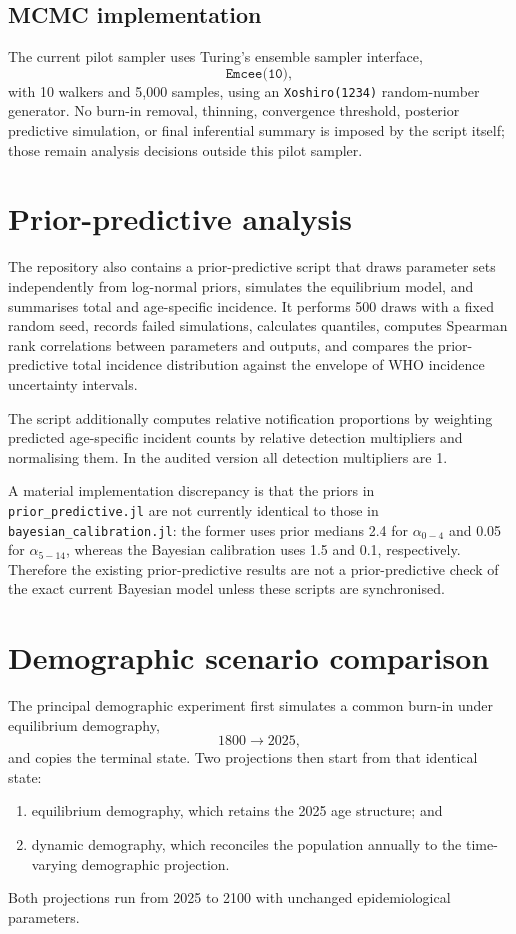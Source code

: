 \documentclass[11pt]{article}
\newcommand{\code}[1]{\texttt{#1}}
\begin{document}
\subsection{MCMC implementation}

The current pilot sampler uses Turing's ensemble sampler interface,
\begin{equation}
\code{Emcee(10)},
\end{equation}
with 10 walkers and 5,000 samples, using an \code{Xoshiro(1234)} random-number generator. No burn-in removal, thinning, convergence threshold, posterior predictive simulation, or final inferential summary is imposed by the script itself; those remain analysis decisions outside this pilot sampler.

\section{Prior-predictive analysis}

The repository also contains a prior-predictive script that draws parameter sets independently from log-normal priors, simulates the equilibrium model, and summarises total and age-specific incidence. It performs 500 draws with a fixed random seed, records failed simulations, calculates quantiles, computes Spearman rank correlations between parameters and outputs, and compares the prior-predictive total incidence distribution against the envelope of WHO incidence uncertainty intervals.

The script additionally computes relative notification proportions by weighting predicted age-specific incident counts by relative detection multipliers and normalising them. In the audited version all detection multipliers are 1.

A material implementation discrepancy is that the priors in \code{prior\_predictive.jl} are not currently identical to those in \code{bayesian\_calibration.jl}: the former uses prior medians 2.4 for $\alpha_{0-4}$ and 0.05 for $\alpha_{5-14}$, whereas the Bayesian calibration uses 1.5 and 0.1, respectively. Therefore the existing prior-predictive results are not a prior-predictive check of the exact current Bayesian model unless these scripts are synchronised.

\section{Demographic scenario comparison}

The principal demographic experiment first simulates a common burn-in under equilibrium demography,
\begin{equation}
1800\longrightarrow 2025,
\end{equation}
and copies the terminal state. Two projections then start from that identical state:
\begin{enumerate}[label=(\alph*)]
\item equilibrium demography, which retains the 2025 age structure; and
\item dynamic demography, which reconciles the population annually to the time-varying demographic projection.
\end{enumerate}
Both projections run from 2025 to 2100 with unchanged epidemiological parameters.
\end{document}
